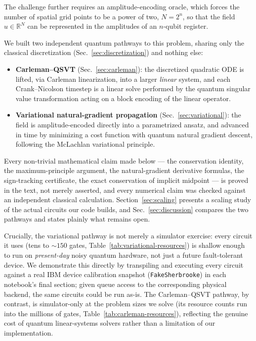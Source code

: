 \documentclass[aps,pra,twocolumn,notitlepage,superscriptaddress,floatfix,10pt]{revtex4-2}
\newcommand{\R}{\mathbb{R}}
\begin{document}
The challenge further requires an amplitude-encoding oracle, which forces the number of spatial grid
points to be a power of two, $N=2^n$, so that the field $u\in\R^N$ can be represented in the
amplitudes of an $n$-qubit register.

We built two independent quantum pathways to this problem, sharing only the classical discretization
(Sec.~\ref{sec:discretization}) and nothing else:
\begin{itemize}
\item \textbf{Carleman--QSVT} (Sec.~\ref{sec:carleman}): the discretized quadratic ODE is lifted, via
Carleman linearization, into a larger \emph{linear} system, and each Crank--Nicolson timestep is a
linear solve performed by the quantum singular value transformation acting on a block encoding of the
linear operator.
\item \textbf{Variational natural-gradient propagation} (Sec.~\ref{sec:variational}): the field is
amplitude-encoded directly into a parametrized ansatz, and advanced in time by minimizing a cost
function with quantum natural gradient descent, following the McLachlan variational principle.
\end{itemize}
Every non-trivial mathematical claim made below --- the conservation identity, the maximum-principle
argument, the natural-gradient derivative formulas, the sign-tracking certificate, the exact
conservation of implicit midpoint --- is proved in the text, not merely asserted, and every numerical
claim was checked against an independent classical calculation. Section~\ref{sec:scaling} presents a
scaling study of the actual circuits our code builds, and Sec.~\ref{sec:discussion} compares the two
pathways and states plainly what remains open.

Crucially, the variational pathway is not merely a simulator exercise: every circuit it uses (tens to
$\sim\!150$ gates, Table~\ref{tab:variational-resources}) is shallow enough to run on \emph{present-day}
noisy quantum hardware, not just a future fault-tolerant device. We demonstrate this directly by
transpiling and executing every circuit against a real IBM device calibration snapshot
(\texttt{FakeSherbrooke}) in each notebook's final section; given queue access to
the corresponding physical backend, the same circuits could be run as-is. The Carleman--QSVT pathway,
by contrast, is simulator-only at the problem sizes we solve (its resource counts run into the millions
of gates, Table~\ref{tab:carleman-resources}), reflecting the genuine cost of quantum linear-systems
solvers rather than a limitation of our implementation.
\end{document}
